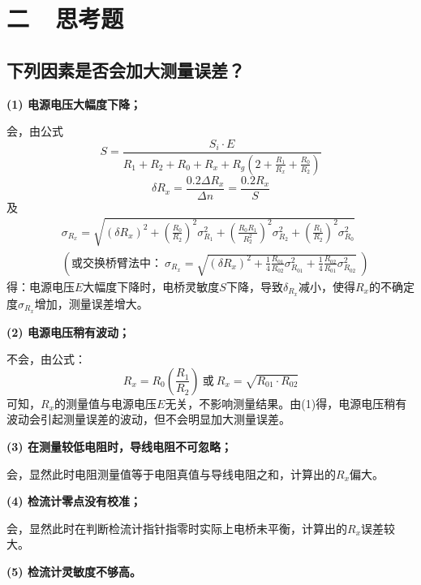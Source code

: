 \documentclass[a4paper]{ctexbook}
\begin{document}
    \bigskip
    \section*{ 二\ \ 思考题}

    \subsection*{ 下列因素是否会加大测量误差？}

    \noindent \textbf{(1) 电源电压大幅度下降；}

    \noindent 会，由公式
    \[
    S = \frac{S_i\cdot E}{R_1+R_2+R_0+R_x+R_g\left(2+\frac{R_1}{R_x}+\frac{R_0}{R_2}\right)}
    \]
    \[
    \delta R_x = \frac{0.2\Delta R_x}{\Delta n} = \frac{0.2R_x}{S}
    \]
    及
    \begin{align*}
    & \sigma_{R_x} = \sqrt{(\delta R_x)^2+\left(\frac{R_0}{R_2}\right)^2\sigma_{R_1}^2+\left(\frac{R_0R_1}{R_2^2}\right)^2\sigma_{R_2}^2+\left(\frac{R_1}{R_2}\right)^2\sigma_{R_0}^2} \\
    & \left(\text{或交换桥臂法中：}\ \sigma_{R_x} = \sqrt{(\delta R_x)^2+\frac{1}{4}\frac{R_{01}}{R_{02}}\sigma_{R_{01}}^2+\frac{1}{4}\frac{R_{02}}{R_{01}}\sigma_{R_{02}}^2}\ \right)
    \end{align*}
    得：电源电压$E$大幅度下降时，电桥灵敏度$S$下降，导致$\delta_{R_x}$减小，使得$R_x$的不确定度$\sigma_{R_x}$增加，测量误差增大。

    \medskip
    \noindent \textbf{(2) 电源电压稍有波动；}

    \noindent 不会，由公式：
    \[
    R_x = R_0\left(\frac{R_1}{R_2}\right)\ \text{或}\ R_x = \sqrt{R_{01}\cdot R_{02}}
    \]
    可知，$R_x$的测量值与电源电压$E$无关，不影响测量结果。由(1)得，电源电压稍有波动会引起测量误差的波动，但不会明显加大测量误差。

    \medskip
    \noindent \textbf{(3) 在测量较低电阻时，导线电阻不可忽略；}

    \noindent 会，显然此时电阻测量值等于电阻真值与导线电阻之和，计算出的$R_x$偏大。

    \medskip
    \noindent \textbf{(4) 检流计零点没有校准；}

    \noindent 会，显然此时在判断检流计指针指零时实际上电桥未平衡，计算出的$R_x$误差较大。

    \medskip
    \noindent \textbf{(5) 检流计灵敏度不够高。}
\end{document}
